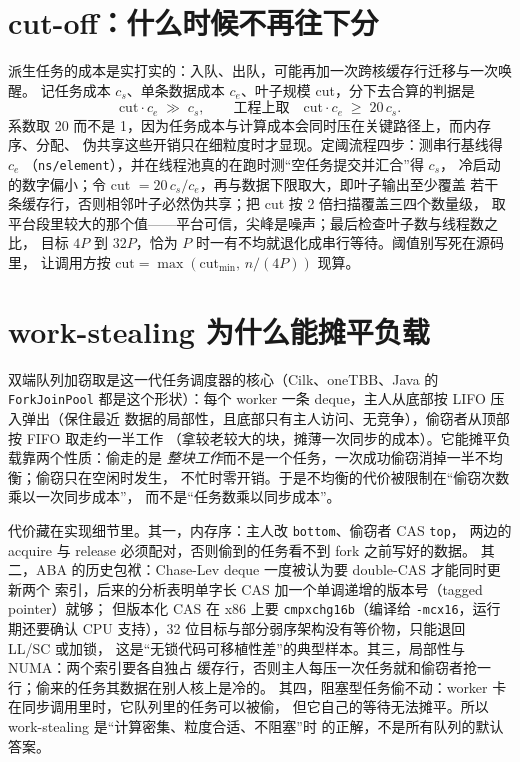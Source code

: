 \documentclass[12pt,a4paper,fontset=fandol]{ctexbook}
\newcommand{\Tp}[1]{\texttt{#1}}
\begin{document}
\section{cut-off：什么时候不再往下分}

派生任务的成本是实打实的：入队、出队，可能再加一次跨核缓存行迁移与一次唤醒。
记任务成本 $c_s$、单条数据成本 $c_e$、叶子规模 cut，分下去合算的判据是
\begin{equation*}
  \text{cut}\cdot c_e \;\gg\; c_s ,
  \qquad\text{工程上取}\quad
  \text{cut}\cdot c_e \;\ge\; 20\,c_s .
\end{equation*}
系数取 20 而不是 1，因为任务成本与计算成本会同时压在关键路径上，而内存序、分配、
伪共享这些开销只在细粒度时才显现。定阈流程四步：测串行基线得 $c_e$
（\Tp{ns/element}），并在线程池真的在跑时测``空任务提交并汇合''得 $c_s$，
冷启动的数字偏小；令 cut $=20\,c_s/c_e$，再与数据下限取大，即叶子输出至少覆盖
若干条缓存行，否则相邻叶子必然伪共享；把 cut 按 2 倍扫描覆盖三四个数量级，
取平台段里较大的那个值——平台可信，尖峰是噪声；最后检查叶子数与线程数之比，
目标 $4P$ 到 $32P$，恰为 $P$ 时一有不均就退化成串行等待。阈值别写死在源码里，
让调用方按 $\text{cut}=\max(\text{cut}_{\min},\,n/(4P))$ 现算。

\section{work-stealing 为什么能摊平负载}

双端队列加窃取是这一代任务调度器的核心（Cilk、oneTBB、Java 的 \Tp{ForkJoinPool}
都是这个形状）：每个 worker 一条 deque，主人从底部按 LIFO 压入弹出（保住最近
数据的局部性，且底部只有主人访问、无竞争），偷窃者从顶部按 FIFO 取走约一半工作
（拿较老较大的块，摊薄一次同步的成本）。它能摊平负载靠两个性质：偷走的是
\emph{整块工作}而不是一个任务，一次成功偷窃消掉一半不均衡；偷窃只在空闲时发生，
不忙时零开销。于是不均衡的代价被限制在``偷窃次数乘以一次同步成本''，
而不是``任务数乘以同步成本''。

代价藏在实现细节里。其一，内存序：主人改 \Tp{bottom}、偷窃者 CAS \Tp{top}，
两边的 acquire 与 release 必须配对，否则偷到的任务看不到 fork 之前写好的数据。
其二，ABA 的历史包袱：Chase-Lev deque 一度被认为要 double-CAS 才能同时更新两个
索引，后来的分析表明单字长 CAS 加一个单调递增的版本号（tagged pointer）就够；
但版本化 CAS 在 x86 上要 \Tp{cmpxchg16b}（编译给 \Tp{-mcx16}，运行期还要确认
CPU 支持），32 位目标与部分弱序架构没有等价物，只能退回 LL/SC 或加锁，
这是``无锁代码可移植性差''的典型样本。其三，局部性与 NUMA：两个索引要各自独占
缓存行，否则主人每压一次任务就和偷窃者抢一行；偷来的任务其数据在别人核上是冷的。
其四，阻塞型任务偷不动：worker 卡在同步调用里时，它队列里的任务可以被偷，
但它自己的等待无法摊平。所以 work-stealing 是``计算密集、粒度合适、不阻塞''时
的正解，不是所有队列的默认答案。
\end{document}
